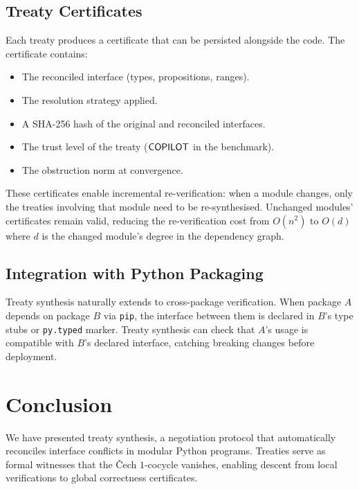 \documentclass[11pt]{article}
\begin{document}
\subsection{Treaty Certificates}

Each treaty produces a certificate that can be persisted alongside
the code.  The certificate contains:
\begin{itemize}[nosep]
\item The reconciled interface (types, propositions, ranges).
\item The resolution strategy applied.
\item A SHA-256 hash of the original and reconciled interfaces.
\item The trust level of the treaty ($\mathsf{COPILOT}$ in the benchmark).
\item The obstruction norm at convergence.
\end{itemize}

These certificates enable incremental re-verification: when a module
changes, only the treaties involving that module need to be
re-synthesised.  Unchanged modules' certificates remain valid,
reducing the re-verification cost from $O(n^2)$ to $O(d)$ where $d$
is the changed module's degree in the dependency graph.

\subsection{Integration with Python Packaging}

Treaty synthesis naturally extends to cross-package verification.
When package $A$ depends on package $B$ via \texttt{pip}, the
interface between them is declared in $B$'s type stubs or
\texttt{py.typed} marker.  Treaty synthesis can check that $A$'s
usage is compatible with $B$'s declared interface, catching
breaking changes before deployment.

\section{Conclusion}\label{sec:conclusion}

We have presented treaty synthesis, a negotiation protocol that
automatically reconciles interface conflicts in modular Python
programs.  Treaties serve as formal witnesses that the \v{C}ech
$1$-cocycle vanishes, enabling descent from local verifications to
global correctness certificates.
\end{document}
